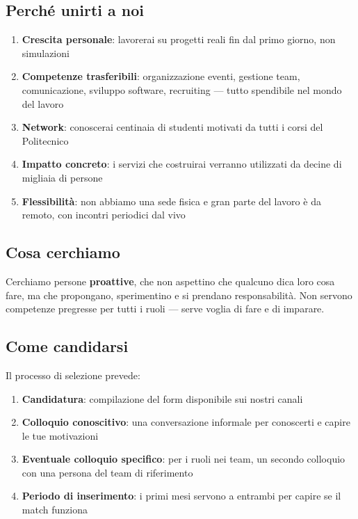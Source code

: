 \documentclass[letter]{core/polinetwork}
\begin{document}
\subsection{Perché unirti a noi}

\begin{enumerate}[leftmargin=2em]
    \item \textbf{Crescita personale}: lavorerai su progetti reali
          fin dal primo giorno, non simulazioni
    \item \textbf{Competenze trasferibili}: organizzazione eventi,
          gestione team, comunicazione, sviluppo software, recruiting
          — tutto spendibile nel mondo del lavoro
    \item \textbf{Network}: conoscerai centinaia di studenti
          motivati da tutti i corsi del Politecnico
    \item \textbf{Impatto concreto}: i servizi che costruirai
          verranno utilizzati da decine di migliaia di persone
    \item \textbf{Flessibilità}: non abbiamo una sede fisica e gran
          parte del lavoro è da remoto, con incontri periodici
          dal vivo
\end{enumerate}

\subsection{Cosa cerchiamo}

Cerchiamo persone \textbf{proattive}, che non aspettino che qualcuno
dica loro cosa fare, ma che propongano, sperimentino e si prendano
responsabilità. Non servono competenze pregresse per tutti i ruoli
— serve voglia di fare e di imparare.

\subsection{Come candidarsi}

Il processo di selezione prevede:
\begin{enumerate}[leftmargin=2em]
    \item \textbf{Candidatura}: compilazione del form disponibile
          sui nostri canali
    \item \textbf{Colloquio conoscitivo}: una conversazione informale
          per conoscerti e capire le tue motivazioni
    \item \textbf{Eventuale colloquio specifico}: per i ruoli nei
          team, un secondo colloquio con una persona del team
          di riferimento
    \item \textbf{Periodo di inserimento}: i primi mesi servono a
          entrambi per capire se il match funziona
\end{enumerate}
\end{document}
